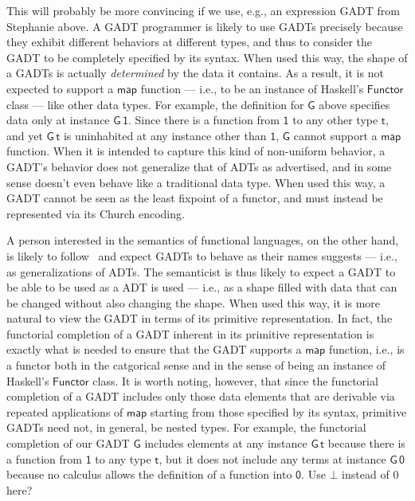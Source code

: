 \documentclass[acmsmall,screen,review,anonymous]{acmart}
\theoremstyle{definition}
\begin{document}
{\color{red} This will probably be more convincing if we use, e.g.,
  an expression GADT from Stephanie above.}
A GADT programmer is likely to use GADTs precisely because they
exhibit different behaviors at different types, and thus to consider
the GADT to be completely specified by its syntax. When used this way,
the shape of a GADTs is actually {\em determined} by the data it
contains. As a result, it is not expected to support a $\mathsf{map}$
function --- i.e., to be an instance of Haskell's $\mathsf{Functor}$
class --- like other data types. For example, the definition for
$\mathsf{G}$ above specifies data only at instance $\mathsf{G\,1}$.
Since there is a function from $\mathsf{1}$ to any other type
$\mathsf{t}$, and yet $\mathsf{G\,t}$ is uninhabited at any instance
other than $\mathsf{1}$, $\mathsf{G}$ cannot support a $\mathsf{map}$
function. When it is intended to capture this kind of non-uniform
behavior, a GADT's behavior does not generalize that of ADTs as
advertised, and in some sense doesn't even behave like a traditional
data type.  When used this way, a GADT cannot be seen as the least
fixpoint of a functor, and must instead be represented via its Church
encoding.

A person interested in the semantics of functional languages, on the
other hand, is likely to follow~\cite{bfss90} and expect GADTs to
behave as their names suggests --- i.e., as generalizations of
ADTs. The semanticist is thus likely to expect a GADT to be able to be
used as a ADT is used --- i.e., as a shape filled with data that can
be changed without also changing the shape. When used this way, it is
more natural to view the GADT in terms of its primitive
representation. In fact, the functorial completion of a GADT inherent
in its primitive representation is exactly what is needed to ensure
that the GADT supports a $\mathsf{map}$ function, i.e., is a functor
both in the catgorical sense and in the sense of being an instance of
Haskell's $\mathsf{Functor}$ class.  It is worth noting, however, that
since the functorial completion of a GADT includes only those data
elements that are derivable via repeated applications of
$\mathsf{map}$ starting from those specified by its syntax, primitive
GADTs need not, in general, be nested types. For example, the
functorial completion of our GADT $\mathsf{G}$ includes elements at
any instance $\mathsf{G\,t}$ because there is a function from
$\mathsf{1}$ to any type $\mathsf{t}$, but it does not include any
terms at instance $\mathsf{G\,0}$ because no calculus allows the
definition of a function into $\mathsf{0}$. {\color{blue} Use $\bot$
  instead of $0$ here?}
\end{document}
